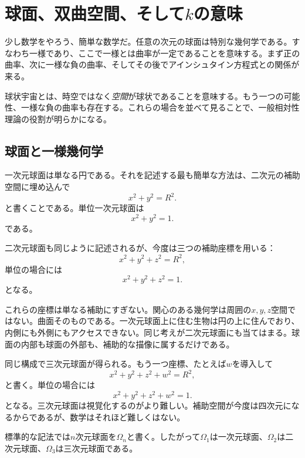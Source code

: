 \chapter{球面、双曲空間、そして\(k\)の意味}

少し数学をやろう、簡単な数学だ。任意の次元の球面は特別な幾何学である。すなわち一様であり、ここで一様とは曲率が一定であることを意味する。まず正の曲率、次に一様な負の曲率、そしてその後でアインシュタイン方程式との関係が来る。

球状宇宙とは、時空ではなく\emph{空間}が球状であることを意味する。もう一つの可能性、一様な負の曲率も存在する。これらの場合を並べて見ることで、一般相対性理論の役割が明らかになる。

\section{球面と一様幾何学}

一次元球面は単なる円である。それを記述する最も簡単な方法は、二次元の補助空間に埋め込んで
\begin{equation}
x^2+y^2=R^2.
\end{equation}
と書くことである。単位一次元球面は
\begin{equation}
x^2+y^2=1.
\end{equation}
である。

二次元球面も同じように記述されるが、今度は三つの補助座標を用いる：
\begin{equation}
x^2+y^2+z^2=R^2,
\end{equation}
単位の場合には
\begin{equation}
x^2+y^2+z^2=1.
\end{equation}
となる。

これらの座標は単なる補助にすぎない。関心のある幾何学は周囲の\(x,y,z\)空間ではない。曲面そのものである。一次元球面上に住む生物は円の上に住んでおり、内側にも外側にもアクセスできない。同じ考えが二次元球面にも当てはまる。球面の内部も球面の外部も、補助的な描像に属するだけである。

同じ構成で三次元球面が得られる。もう一つ座標、たとえば\(w\)を導入して
\begin{equation}
x^2+y^2+z^2+w^2=R^2,
\end{equation}
と書く。単位の場合には
\begin{equation}
x^2+y^2+z^2+w^2=1.
\end{equation}
となる。三次元球面は視覚化するのがより難しい。補助空間が今度は四次元になるからであるが、数学はそれほど難しくはない。

標準的な記法では\(n\)次元球面を\(\Omega_n\)と書く。したがって\(\Omega_1\)は一次元球面、\(\Omega_2\)は二次元球面、\(\Omega_3\)は三次元球面である。

